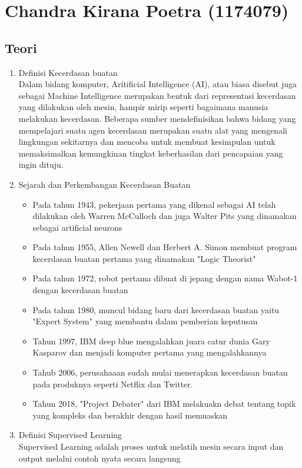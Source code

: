 \section{Chandra Kirana Poetra (1174079)}
\subsection{Teori}
\begin{enumerate}
\item Definisi Kecerdasan buatan\\ 
Dalam bidang komputer, Aritificial Intelligence (AI), atau biasa disebut juga sebagai Machine Intelligence merupakan bentuk dari representasi kecerdasan yang dilakukan oleh mesin, hampir mirip seperti bagaimana manusia melakukan kecerdasan. Beberapa sumber mendefinisikan  bahwa bidang yang mempelajari suatu agen kecerdasan merupakan suatu alat yang mengenali lingkungan sekitarnya dan mencoba untuk membuat kesimpulan untuk memaksimalkan kemungkinan tingkat keberhasilan dari pencapaian yang ingin dituju.

\item Sejarah dan Perkembangan Kecerdasan Buatan
\begin{itemize}
\item Pada tahun 1943, pekerjaan pertama yang dikenal sebagai AI telah dilakukan oleh Warren McCulloch dan juga Walter Pits yang dinamakan sebagai artificial neurons
\item Pada tahun 1955, Allen Newell dan Herbert A. Simon membuat program kecerdasan buatan pertama yang dinamakan "Logic Theorist"
\item Pada tahun 1972, robot pertama dibuat di jepang dengan nama Wabot-1 dengan kecerdasan buatan
\item Pada tahun 1980, muncul bidang baru dari kecerdasan buatan yaitu "Expert System" yang membantu dalam pemberian keputusan
\item Tahun 1997, IBM deep blue mengalahkan juara catur dunia Gary Kasparov dan menjadi komputer pertama yang mengalahkannya
\item Tahub 2006, perusahaaan sudah mulai menerapkan kecerdasan buatan pada produknya seperti Netflix dan Twitter.
\item Tahun 2018, "Project Debater" dari IBM melakuakn debat tentang topik yang kompleks dan berakhir dengan hasil memuaskan
\end{itemize}

\item Definisi Supervised Learning\\
Supervised Learning adalah proses untuk melatih mesin secara input dan output melalui contoh nyata secara langsung


\end{enumerate}
